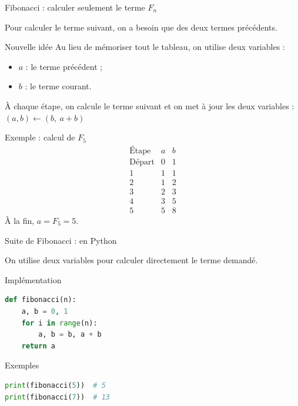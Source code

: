 \documentclass[10pt]{beamer}
\begin{document}
\begin{frame}{Fibonacci : calculer seulement le terme $F_n$}

Pour calculer le terme suivant, on a besoin que
des deux termes précédents.

\pause

\begin{block}{Nouvelle idée}
Au lieu de mémoriser tout le tableau, on utilise deux variables :
\begin{itemize}
    \item $a$ : le terme précédent ;
    \item $b$ : le terme courant.
\end{itemize}
À chaque étape, on calcule le terme suivant et on met à jour
les deux variables :
$
(a,b) \leftarrow (b,\ a+b)
$
\end{block}

\pause

\begin{exampleblock}{Exemple : calcul de $F_5$}
\footnotesize
\[
\begin{array}{c|c|c}
\text{Étape} & a & b\\
\hline
\text{Départ} & 0 & 1\\
1 & 1 & 1\\
2 & 1 & 2\\
3 & 2 & 3\\
4 & 3 & 5\\
5 & 5 & 8
\end{array}
\]
À la fin, $a=F_5=5$.
\end{exampleblock}

\end{frame}
\begin{frame}[fragile]{Suite de Fibonacci : en Python}

On utilise deux variables pour calculer directement
le terme demandé.

\begin{exampleblock}{Implémentation}
\begin{lstlisting}[language=Python]
def fibonacci(n):
    a, b = 0, 1
    for i in range(n):
        a, b = b, a + b
    return a
\end{lstlisting}
\end{exampleblock}

\pause

\begin{exampleblock}{Exemples}
\begin{lstlisting}[language=Python]
print(fibonacci(5))  # 5
print(fibonacci(7))  # 13
\end{lstlisting}
\end{exampleblock}

\end{frame}
\end{document}
